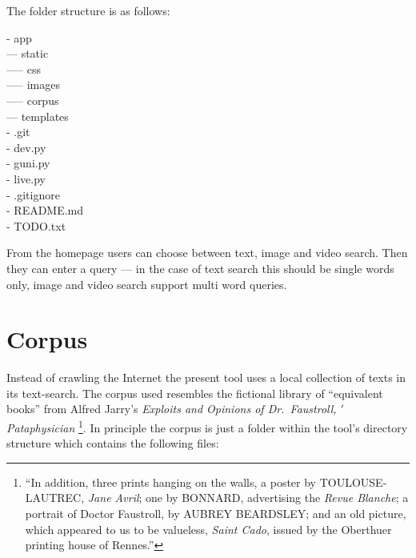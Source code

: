 The folder structure is as follows:

- app\\
--- static\\
----- css\\
----- images\\
----- corpus\\
--- templates\\
- .git\\
- dev.py\\
- guni.py\\
- live.py\\
- .gitignore\\
- README.md\\
- TODO.txt

From the homepage users can choose between text, image and video search. Then they can enter a query --- in the case of text search this should be single words only, image and video search support multi word queries.


\section{Corpus}

Instead of crawling the Internet the present tool uses a local collection of texts in its text-search. The corpus used resembles the fictional library of ``equivalent books'' from Alfred Jarry's \emph{Exploits and Opinions of Dr.\ Faustroll, $'$Pataphysician} \citeyear[p.10-12]{Jarry1996}\footnote{``In addition, three prints hanging on the walls, a poster by TOULOUSE-LAUTREC, \emph{Jane Avril}; one by BONNARD, advertising the \emph{Revue Blanche}; a portrait of Doctor Faustroll, by AUBREY BEARDSLEY\@; and an old picture, which appeared to us to be valueless, \emph{Saint Cado}, issued by the Oberthuer printing house of Rennes.''\parencite[p.12]{Jarry1996}}. In principle the \hypertarget{corpus}{corpus}\label{ref:corpus} is just a folder within the tool's directory structure which contains the following files:

